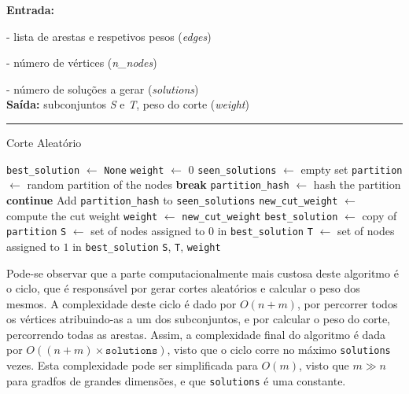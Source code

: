 \documentclass[mirror, portugues]{revdetua}
\begin{document}
\begin{algorithm}[H]
\raggedright
\textbf{Entrada:}

- lista de arestas e respetivos pesos (\textit{edges})

- número de vértices (\textit{n\_nodes})

- número de soluções a gerar (\textit{solutions})\\
\textbf{Saída:} subconjuntos \textit{S} e \textit{T}, peso do corte (\textit{weight}) \\
\hrule 
\caption{Corte Aleatório}
\begin{algorithmic}[1]
    \State \texttt{best\_solution} $\gets$ \texttt{None}
    \State \texttt{weight} $\gets$ 0
    \State \texttt{seen\_solutions} $\gets$ empty set
        \State \texttt{partition} $\gets$ random partition of the nodes
            \State \textbf{break}
        \EndIf
        \State \texttt{partition\_hash} $\gets$ hash the partition
            \State \textbf{continue}
        \EndIf
        \State Add \texttt{partition\_hash} to \texttt{seen\_solutions}
        \State \texttt{new\_cut\_weight} $\gets$ compute the cut weight
            \State \texttt{weight} $\gets$ \texttt{new\_cut\_weight}
            \State \texttt{best\_solution} $\gets$ copy of \texttt{partition}
        \EndIf
    \EndFor
    \State \texttt{S} $\gets$ set of nodes assigned to $0$ in \texttt{best\_solution}
    \State \texttt{T} $\gets$ set of nodes assigned to $1$ in \texttt{best\_solution}
    \Return \texttt{S}, \texttt{T}, \texttt{weight}
\end{algorithmic}
\end{algorithm}
    
Pode-se observar que a parte computacionalmente mais custosa deste algoritmo é o ciclo, que é responsável por gerar cortes aleatórios e calcular o peso dos mesmos. A complexidade deste ciclo é dado por $O(n + m)$, por percorrer todos os vértices atribuindo-as a um dos subconjuntos, e por calcular o peso do corte, percorrendo todas as arestas. Assim, a complexidade final do algoritmo é dada por $O((n + m) \times \texttt{solutions})$, visto que o ciclo corre no máximo \texttt{solutions} vezes. Esta complexidade pode ser simplificada para $O(m)$, visto que $m \gg n$ para gradfos de grandes dimensões, e que \texttt{solutions} é uma constante.
\end{document}
